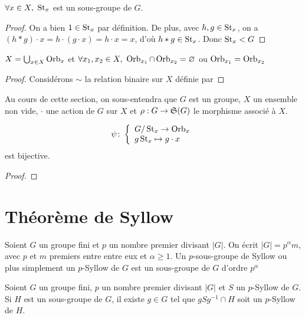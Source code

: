 \begin{proposition}
    $\forall x\in X,\ \operatorname{St}_x$ est un sous-groupe de $G$.
\end{proposition}

\begin{proof}
    On a bien $1\in \operatorname{St}_x$ par définition. De plus, avec $h,g\in \operatorname{St}_x$, on a $(h*g)\cdot x = h\cdot(g\cdot x) = h\cdot x = x$, d'où $h*g\in\operatorname{St}_x$. Donc $\operatorname{St}_x<G$
\end{proof}

\begin{proposition}
    $X=\bigcup_{x\in X}\operatorname{Orb}_x$ et $\forall x_1,x_2\in X,\ \operatorname{Orb}_{x_1}\cap\operatorname{Orb}_{x_2} = \varnothing$ ou $\operatorname{Orb}_{x_1}=\operatorname{Orb}_{x_2}$
\end{proposition}

\begin{proof}
    Considérons $\sim$ la relation binaire sur $X$ définie par 
\end{proof}

\begin{notation}
    Au cours de cette section, on sous-entendra que $G$ est un groupe, $X$ un ensemble non vide, $\cdot$ une action de $G$ sur $X$ et $\rho:G\to\mathfrak{S}(G)$ le morphisme associé à $X$. 
\end{notation}

\begin{proposition}
    \begin{equation*}\psi\colon \left\{\begin{array}{l}G/\operatorname{St}_x\to\operatorname{Orb}_x \\g\operatorname{St}_x\mapsto g\cdot x\end{array}\right.
    \end{equation*}
    est bijective.
\end{proposition}

\begin{proof}
\end{proof}

\section{Théorème de Syllow}

\begin{definition}
    Soient $G$ un groupe fini et $p$ un nombre premier divisant $|G|$. On écrit $|G|=p^\alpha m$, avec $p$ et $m$ premiers entre entre eux et $\alpha \geq 1$. Un $p$-sous-groupe de Syllow ou plus simplement un $p$-Syllow de $G$ est un sous-groupe de $G$ d'ordre $p^\alpha$
\end{definition}

\begin{proposition}
        Soient $G$ un groupe fini, $p$ un nombre premier divisant $|G|$ et $S$ un $p$-Syllow de $G$. Si $H$ est un sous-groupe de $G$, il existe $g\in G$ tel que $gSg^{-1}\cap H$ soit un $p$-Syllow de $H$.
\end{proposition}

